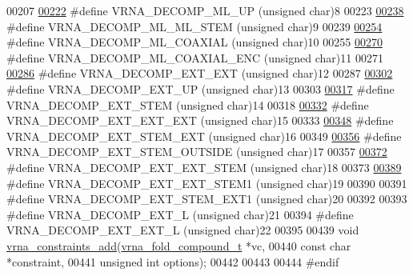 \begin{DoxyCode}
00207 
\hyperlink{group__constraints_gae6478dda14e50e2f2cb9ef333a29256e}{00222} \textcolor{preprocessor}{#define VRNA\_DECOMP\_ML\_UP       (unsigned char)8}
00223 
\hyperlink{group__constraints_ga63d8ceb8c96ae3b463e529e28cc0fe98}{00238} \textcolor{preprocessor}{#define VRNA\_DECOMP\_ML\_ML\_STEM (unsigned char)9}
00239 
\hyperlink{group__constraints_ga4fe48d575830b16c208e280e01ab1497}{00254} \textcolor{preprocessor}{#define VRNA\_DECOMP\_ML\_COAXIAL  (unsigned char)10}
00255 
\hyperlink{group__constraints_ga0224727f7b8ad2f23eb0a3fd28d8b3fb}{00270} \textcolor{preprocessor}{#define VRNA\_DECOMP\_ML\_COAXIAL\_ENC  (unsigned char)11}
00271 
\hyperlink{group__constraints_ga437adf5115c1999304eff26b41e4c9b6}{00286} \textcolor{preprocessor}{#define VRNA\_DECOMP\_EXT\_EXT     (unsigned char)12}
00287 
\hyperlink{group__constraints_gaff1ddaffe86d984623910b40cc8a8717}{00302} \textcolor{preprocessor}{#define VRNA\_DECOMP\_EXT\_UP      (unsigned char)13}
00303 
\hyperlink{group__constraints_gae44b5ace0d9b4a29088069ecb4cec441}{00317} \textcolor{preprocessor}{#define VRNA\_DECOMP\_EXT\_STEM (unsigned char)14}
00318 
\hyperlink{group__constraints_ga803bd818b3f4b2b0a4a5cfa2f7dc2045}{00332} \textcolor{preprocessor}{#define VRNA\_DECOMP\_EXT\_EXT\_EXT (unsigned char)15}
00333 
\hyperlink{group__constraints_gabb09c5b78b75a44502fc77b950125c1e}{00348} \textcolor{preprocessor}{#define VRNA\_DECOMP\_EXT\_STEM\_EXT (unsigned char)16}
00349 
\hyperlink{group__constraints_gae7554cd3ff089360c02e4920229e221c}{00356} \textcolor{preprocessor}{#define VRNA\_DECOMP\_EXT\_STEM\_OUTSIDE (unsigned char)17}
00357 
\hyperlink{group__constraints_ga06efd054c9271438f6d82d4559d9e69f}{00372} \textcolor{preprocessor}{#define VRNA\_DECOMP\_EXT\_EXT\_STEM (unsigned char)18}
00373 
\hyperlink{group__constraints_ga2e75d7a77118735b32f25422d9686719}{00389} \textcolor{preprocessor}{#define VRNA\_DECOMP\_EXT\_EXT\_STEM1 (unsigned char)19}
00390 
00391 \textcolor{preprocessor}{#define VRNA\_DECOMP\_EXT\_STEM\_EXT1 (unsigned char)20}
00392 
00393 \textcolor{preprocessor}{#define VRNA\_DECOMP\_EXT\_L         (unsigned char)21}
00394 \textcolor{preprocessor}{#define VRNA\_DECOMP\_EXT\_EXT\_L     (unsigned char)22}
00395 
00439 \textcolor{keywordtype}{void} \hyperlink{group__constraints_ga35a401f680969a556858a8dd5f1d07cc}{vrna\_constraints\_add}(\hyperlink{group__fold__compound_structvrna__fc__s}{vrna\_fold\_compound\_t}  *vc,
00440                           \textcolor{keyword}{const} \textcolor{keywordtype}{char}            *constraint,
00441                           \textcolor{keywordtype}{unsigned} \textcolor{keywordtype}{int}          options);
00442 
00443 
00444 \textcolor{preprocessor}{#endif}
\end{DoxyCode}
